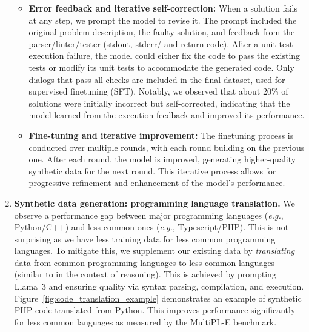 \begin{enumerate}
\begin{itemize}

        \item \textbf{Error feedback and iterative self-correction:} When a solution fails at any step, we prompt the model to revise it. The prompt included the original problem description, the faulty solution, and feedback from the parser/linter/tester (stdout, stderr/ and return code). After a unit test execution failure, the model could either fix the code to pass the existing tests or modify its unit tests to accommodate the generated code. Only dialogs that pass all checks are included in the final dataset, used for supervised finetuning (SFT). Notably, we observed that about 20\% of solutions were initially incorrect but self-corrected, indicating that the model learned from the execution feedback and improved its performance.

        \item \textbf{Fine-tuning and iterative improvement:} The finetuning process is conducted over multiple rounds, with each round building on the previous one. After each round, the model is improved, generating higher-quality synthetic data for the next round. This iterative process allows for progressive refinement and enhancement of the model's performance.
    \end{itemize}

    \item{\textbf{Synthetic data generation: programming language translation.}} We observe a performance gap between major programming languages (\emph{e.g.}, Python/C++) and less common ones (\emph{e.g.}, Typescript/PHP). This is not surprising as we have less training data for less common programming languages. To mitigate this, we supplement our existing data by \emph{translating} data from common programming languages to less common languages (similar to \cite{chen2023breakinglanguagebarriersmultilingual} in the context of reasoning). This is achieved by prompting Llama~3 and ensuring quality via syntax parsing, compilation, and execution. Figure~\ref{fig:code_translation_example} demonstrates an example of synthetic PHP code translated from Python. This improves performance significantly for less common languages as measured by the MultiPL-E \citep{cassano2022multiple} benchmark. 


\end{enumerate}
